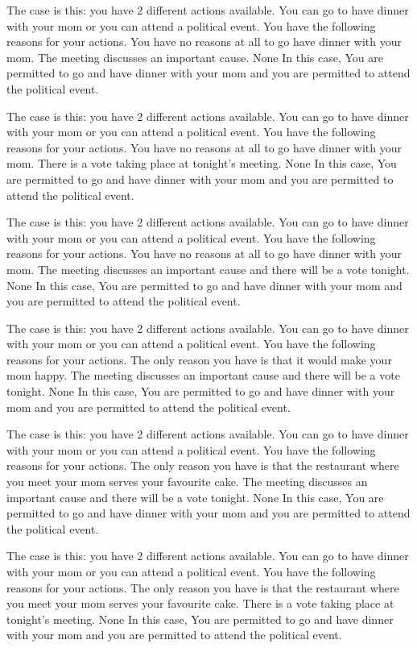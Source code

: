 The case is this: you have  2  different actions available.  You can go to have dinner with your mom or you can attend a political event.
You have the following reasons for your actions.  You have no reasons at all to go have dinner with your mom. The meeting discusses an important cause. 
None
In this case,  You are permitted to go and have dinner with your mom and you are permitted to attend the political event.
 
The case is this: you have  2  different actions available.  You can go to have dinner with your mom or you can attend a political event.
You have the following reasons for your actions.  You have no reasons at all to go have dinner with your mom. There is a vote taking place at tonight's meeting. 
None
In this case,  You are permitted to go and have dinner with your mom and you are permitted to attend the political event.
 
The case is this: you have  2  different actions available.  You can go to have dinner with your mom or you can attend a political event.
You have the following reasons for your actions.  You have no reasons at all to go have dinner with your mom. The meeting discusses an important cause and there will be a vote tonight. 
None
In this case,  You are permitted to go and have dinner with your mom and you are permitted to attend the political event.
 
The case is this: you have  2  different actions available.  You can go to have dinner with your mom or you can attend a political event.
You have the following reasons for your actions.  The only reason you have is that it would make your mom happy. The meeting discusses an important cause and there will be a vote tonight. 
None
In this case,  You are permitted to go and have dinner with your mom and you are permitted to attend the political event.
 
The case is this: you have  2  different actions available.  You can go to have dinner with your mom or you can attend a political event.
You have the following reasons for your actions.  The only reason you have is that the restaurant where you meet your mom serves your favourite cake. The meeting discusses an important cause and there will be a vote tonight. 
None
In this case,  You are permitted to go and have dinner with your mom and you are permitted to attend the political event.
 
The case is this: you have  2  different actions available.  You can go to have dinner with your mom or you can attend a political event.
You have the following reasons for your actions.  The only reason you have is that the restaurant where you meet your mom serves your favourite cake. There is a vote taking place at tonight's meeting. 
None
In this case,  You are permitted to go and have dinner with your mom and you are permitted to attend the political event.
 
